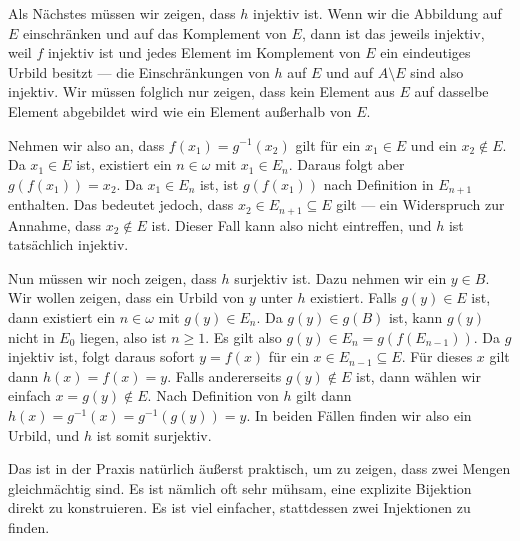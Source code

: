 \begin{spoken-clean}[00:29:10 - 00:30:49]
Als Nächstes müssen wir zeigen, dass $h$ injektiv ist. Wenn wir die Abbildung auf $E$ einschränken und auf das Komplement von $E$, dann ist das jeweils injektiv, weil $f$ injektiv ist und jedes Element im Komplement von $E$ ein eindeutiges Urbild besitzt --- die Einschränkungen von $h$ auf $E$ und auf $A \setminus E$ sind also injektiv. Wir müssen folglich nur zeigen, dass kein Element aus $E$ auf dasselbe Element abgebildet wird wie ein Element außerhalb von $E$.

Nehmen wir also an, dass $f(x_1) = g^{-1}(x_2)$ gilt für ein $x_1 \in E$ und ein $x_2 \notin E$. Da $x_1 \in E$ ist, existiert ein $n \in \omega$ mit $x_1 \in E_n$. Daraus folgt aber $g(f(x_1)) = x_2$. Da $x_1 \in E_n$ ist, ist $g(f(x_1))$ nach Definition in $E_{n+1}$ enthalten. Das bedeutet jedoch, dass $x_2 \in E_{n+1} \subseteq E$ gilt --- ein Widerspruch zur Annahme, dass $x_2 \notin E$ ist. Dieser Fall kann also nicht eintreffen, und $h$ ist tatsächlich injektiv.

Nun müssen wir noch zeigen, dass $h$ surjektiv ist. Dazu nehmen wir ein $y \in B$. Wir wollen zeigen, dass ein Urbild von $y$ unter $h$ existiert. Falls $g(y) \in E$ ist, dann existiert ein $n \in \omega$ mit $g(y) \in E_n$. Da $g(y) \in g(B)$ ist, kann $g(y)$ nicht in $E_0$ liegen, also ist $n \ge 1$. Es gilt also $g(y) \in E_n = g(f(E_{n-1}))$. Da $g$ injektiv ist, folgt daraus sofort $y = f(x)$ für ein $x \in E_{n-1} \subseteq E$. Für dieses $x$ gilt dann $h(x) = f(x) = y$. Falls andererseits $g(y) \notin E$ ist, dann wählen wir einfach $x = g(y) \notin E$. Nach Definition von $h$ gilt dann $h(x) = g^{-1}(x) = g^{-1}(g(y)) = y$. In beiden Fällen finden wir also ein Urbild, und $h$ ist somit surjektiv.

Das ist in der Praxis natürlich äußerst praktisch, um zu zeigen, dass zwei Mengen gleichmächtig sind. Es ist nämlich oft sehr mühsam, eine explizite Bijektion direkt zu konstruieren. Es ist viel einfacher, stattdessen zwei Injektionen zu finden.
\end{spoken-clean}


